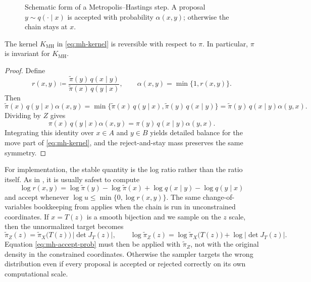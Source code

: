 \begin{figure}[t]
  \centering
  
  \caption{Schematic form of a Metropolis--Hastings step.
  A proposal $y\sim q(\cdot\mid x)$ is accepted with probability $\alpha(x,y)$; otherwise the chain stays at $x$.}
  \label{fig:mh-kernel}
\end{figure}

\begin{proposition}
\label{prop:mh-detailed-balance}
The kernel $K_{\mathrm{MH}}$ in \eqref{eq:mh-kernel} is reversible with respect to $\pi$.
In particular, $\pi$ is invariant for $K_{\mathrm{MH}}$.
\end{proposition}
\begin{proof}
Define
\[
  r(x,y)\coloneqq \frac{\tilde\pi(y)\,q(x\mid y)}{\tilde\pi(x)\,q(y\mid x)},
  \qquad
  \alpha(x,y)=\min\{1,r(x,y)\}.
\]
Then
\[
  \tilde\pi(x)\,q(y\mid x)\alpha(x,y)
  =
  \min\!\bigl\{\tilde\pi(x)\,q(y\mid x),\tilde\pi(y)\,q(x\mid y)\bigr\}
  =
  \tilde\pi(y)\,q(x\mid y)\alpha(y,x).
\]
Dividing by $Z$ gives
\[
  \pi(x)\,q(y\mid x)\alpha(x,y)
  =
  \pi(y)\,q(x\mid y)\alpha(y,x).
\]
Integrating this identity over $x\in A$ and $y\in B$ yields detailed balance for the move part of \eqref{eq:mh-kernel}, and the reject-and-stay mass preserves the same symmetry.
\end{proof}

For implementation, the stable quantity is the log ratio rather than the ratio itself.
As in , it is usually safest to compute
\[
  \log r(x,y)
  =
  \log \tilde\pi(y)-\log \tilde\pi(x)+\log q(x\mid y)-\log q(y\mid x)
\]
and accept whenever $\log u \le \min\{0,\log r(x,y)\}$.
The same change-of-variables bookkeeping from  applies when the chain is run in unconstrained coordinates.
If $x=T(z)$ is a smooth bijection and we sample on the $z$ scale, then the unnormalized target becomes
\begin{equation}
  \tilde\pi_Z(z)
  =
  \tilde\pi_X\!\bigl(T(z)\bigr)\,\lvert\det J_T(z)\rvert,
  \qquad
  \log \tilde\pi_Z(z)
  =
  \log \tilde\pi_X\!\bigl(T(z)\bigr)+\log\lvert\det J_T(z)\rvert.
  \label{eq:mh-transformed-target}
\end{equation}
Equation \eqref{eq:mh-accept-prob} must then be applied with $\tilde\pi_Z$, not with the original density in the constrained coordinates.
Otherwise the sampler targets the wrong distribution even if every proposal is accepted or rejected correctly on its own computational scale.

